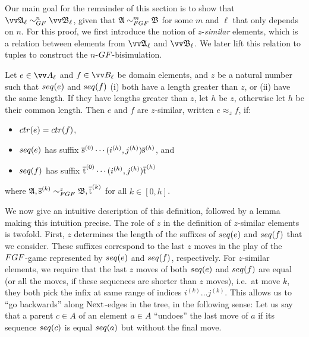 Our main goal for the remainder of this section is to show that $\unravel{A}_{\ell} \bisimto_{\GF}^{n} \unravel{B}_{\ell}$, given that $\str{A} \bisimto_{\FGF}^{m} \str{B}$ for some $m$ and $\ell$ that only depends on $n$.
For this proof, we first introduce the notion of $z$-\emph{similar} elements, which is a relation between elements from $\unravel{A}_{\ell}$ and $\unravel{B}_{\ell}$.
We later lift this relation to tuples to construct the $n$-$\GF$-bisimulation.
\begin{definition}
 Let $e \in \unraveldom{A}_{\ell}$ and $f \in \unraveldom{B}_{\ell}$ be domain elements, and $z$ be a natural number such that $\seq{e}$ and $\seq{f}$ (i) both have a length greater than $z$, or (ii) have the same length.
 If they have lengths greater than $z$, let $h$ be $z$, otherwise let $h$ be their common length.
 Then $e$ and $f$ are $z$-similar, written $e \approx_{z} f$, if:
 \begin{itemize}
   \item $\ctr{e} = \ctr{f}$,
   \item $\seq{e}$ has suffix $\overline{\mathrm{s}}^{(0)}\cdots(i^{(h)},j^{(h)})\overline{\mathrm{s}}^{(h)}$, and
   \item $\seq{f}$ has suffix $\overline{\mathrm{t}}^{(0)}\cdots(i^{(h)},j^{(h)})\overline{\mathrm{t}}^{(h)}$
 \end{itemize}
 where $\str{A}, \elemtuples^{(k)} \bisimto_{\FGF}^{z} \str{B}, \elemtuplet^{(k)}$ for all $k \in [0,h]$.
\end{definition}
We now give an intuitive description of this definition, followed by a lemma making this intuition precise.
The role of $z$ in the definition of $z$-similar elements is twofold.
First, $z$ determines the length of the suffixes of $\seq{e}$ and $\seq{f}$ that we consider.
These suffixes correspond to the last $z$ moves in the play of the $\FGF$-game represented by $\seq{e}$ and $\seq{f}$, respectively.
For $z$-similar elements, we require that the last $z$ moves of both $\seq{e}$ and $\seq{f}$ are equal (or all the moves, if these sequences are shorter than $z$ moves), i.e.\ at move $k$, they both pick the infix at same range of indices $i^{(k)}\ldots{}j^{(k)}$.
This allows us to ``go backwards'' along $\mathrm{Next}$-edges in the tree, in the following sense:
Let us say that a parent $c \in A$ of an element $a \in A$ ``undoes'' the last move of $a$ if its sequence $\seq{c}$ is equal $\seq{a}$ but without the final move.
